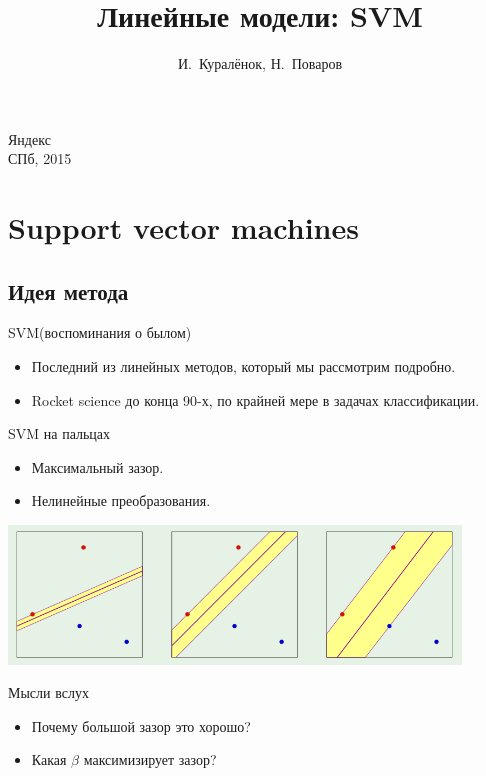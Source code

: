 \documentclass[14pt, fleqn, xcolor={dvipsnames, table}]{beamer}
\title{Линейные модели: SVM\\\small{}}
\author[]{\small{%
И.~Куралёнок,
Н.~Поваров}}
\date{}
\begin{document}
\begin{frame}

\maketitle
\small
\begin{center}
\vspace{-60pt}
\normalsize {\color{red}Я}ндекс \\
\vspace{80pt}
\footnotesize СПб, 2015
\end{center}
\end{frame}


\section{Support vector machines}
\subsection{Идея метода}
\begin{frame}{SVM(воспоминания о былом)}
\begin{itemize}
  \item Последний из линейных методов, который мы рассмотрим подробно.
  \item Rocket science до конца 90-х, по крайней мере в задачах классификации.
\end{itemize}
\end{frame}

\begin{frame}{SVM на пальцах}
\begin{itemize}
  \item Максимальный зазор.
  \item Нелинейные преобразования.
\end{itemize}
\begin{center}
\includegraphics[width=0.9\textwidth]{SVM_1.png}
\end{center}
\end{frame}

\begin{frame}{Мысли вслух}
\begin{itemize}
  \item Почему большой зазор это хорошо?
  \item Какая $\beta$ максимизирует зазор? 
\end{itemize}
\end{frame}
\end{document}
